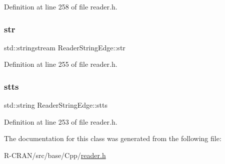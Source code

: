 Definition at line 258 of file reader.\+h.

\mbox{\label{classReaderStringEdge_a65e74b837b4d980c02896e2ca6075e80}} 
\subsubsection{\texorpdfstring{str}{str}}
{\footnotesize\ttfamily std\+::stringstream Reader\+String\+Edge\+::str\hspace{0.3cm}{\ttfamily [private]}}



Definition at line 255 of file reader.\+h.

\mbox{\label{classReaderStringEdge_a574864595ff76d5a314381de5abc1d4d}} 
\subsubsection{\texorpdfstring{stts}{stts}}
{\footnotesize\ttfamily std\+::string Reader\+String\+Edge\+::stts\hspace{0.3cm}{\ttfamily [private]}}



Definition at line 253 of file reader.\+h.



The documentation for this class was generated from the following file\+:\begin{DoxyCompactItemize}
\item 
R-\/\+C\+R\+A\+N/src/base/\+Cpp/\hyperlink{reader_8h}{reader.\+h}\end{DoxyCompactItemize}
